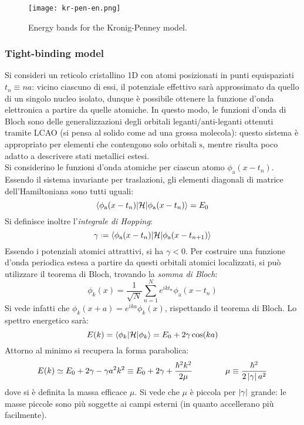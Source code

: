 \begin{figure}
	\centering
	\texttt{[image: kr-pen-en.png]}
	\caption{Energy bands for the Kronig-Penney model.}
	\label{kr-pen-en}
\end{figure}

\subsubsection{Tight-binding model}

Si consideri un reticolo cristallino 1D con atomi posizionati in punti equispaziati $ t_n \equiv na $: vicino ciascuno di essi, il potenziale effettivo sarà approssimato da quello di un singolo nucleo isolato, dunque è possibile ottenere la funzione d'onda elettronica a partire da quelle atomiche. In questo modo, le funzioni d'onda di Bloch sono delle generalizzazioni degli orbitali leganti/anti-leganti ottenuti tramite LCAO (si pensa al solido come ad una grossa molecola): questo sistema è appropriato per elementi che contengono solo orbitali $ \text{s} $, mentre risulta poco adatto a descrivere stati metallici estesi. \\
Si considerino le funzioni d'onda atomiche per ciascun atomo $ \phi_\text{a}(x-t_n) $. Essendo il sistema invariante per traslazioni, gli elementi diagonali di matrice dell'Hamiltoniana sono tutti uguali:
\begin{equation}
	\braket{\phi_\text{a}(x-t_n) | \mathcal{H} | \phi_\text{a}(x-t_n)} = E_0
\end{equation}
Si definisce inoltre l'\textit{integrale di Hopping}:
\begin{equation}
	\gamma \defeq \braket{\phi_\text{a}(x-t_n) | \mathcal{H} | \phi_\text{a}(x-t_{n+1})}
\end{equation}
Essendo i potenziali atomici attrattivi, si ha $ \gamma < 0 $. Per costruire una funzione d'onda periodica estesa a partire da questi orbitali atomici localizzati, si può utilizzare il teorema di Bloch, trovando la \textit{somma di Bloch}:
\begin{equation}
	\phi_k(x) = \frac{1}{\sqrt{N}} \sum_{n = 1}^N e^{i k t_n} \phi_\text{a}(x-t_n)
\end{equation}
Si vede infatti che $ \phi_k(x+a) = e^{ika} \phi_k(x) $, rispettando il teorema di Bloch. Lo spettro energetico sarà:
\begin{equation}
	E(k) = \braket{\phi_k | \mathcal{H} | \phi_k} = E_0 + 2 \gamma \cos(ka)
\end{equation}
Attorno al minimo si recupera la forma parabolica:
\begin{equation}
	E(k) \simeq E_0 + 2\gamma - \gamma a^2 k^2 \equiv E_0 + 2\gamma + \frac{\hbar^2 k^2}{2\mu}
	\qquad \qquad
	\mu \equiv \frac{\hbar^2}{2 \left\lvert\gamma\right\rvert a^2}
\end{equation}
dove si è definita la massa efficace $ \mu $. Si vede che $ \mu $ è piccola per $ \left\lvert\gamma\right\rvert $ grande: le masse piccole sono più soggette ai campi esterni (in quanto accellerano più facilmente).


